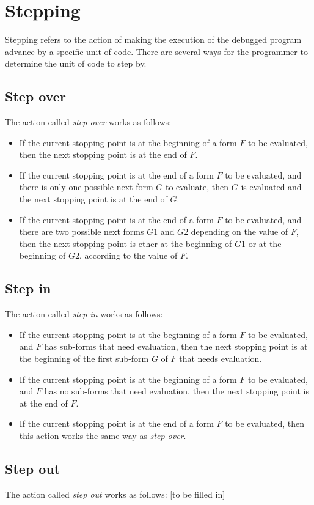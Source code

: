 \chapter{Stepping}

Stepping refers to the action of making the execution of the debugged
program advance by a specific unit of code.  There are several ways
for the programmer to determine the unit of code to step by.

\section{Step over}

The action called \emph{step over} works as follows:

\begin{itemize}
\item If the current stopping point is at the beginning of a form $F$
  to be evaluated, then the next stopping point is at the end of $F$.
\item If the current stopping point is at the end of a form $F$ to be
  evaluated, and there is only one possible next form $G$ to evaluate,
  then $G$ is evaluated and the next stopping point is at
  the end of $G$.
\item If the current stopping point is at the end of a form $F$ to be
  evaluated, and there are two possible next forms $G1$ and $G2$
  depending on the value of $F$, then the next stopping point is ether
  at the beginning of $G1$ or at the beginning of $G2$, according to
  the value of $F$.
\end{itemize}

\section{Step in}

The action called \emph{step in} works as follows:

\begin{itemize}
\item If the current stopping point is at the beginning of a form $F$
  to be evaluated, and $F$ has sub-forms that need evaluation, then
  the next stopping point is at the beginning of the first sub-form
  $G$ of $F$ that needs evaluation.
\item If the current stopping point is at the beginning of a form $F$
  to be evaluated, and $F$ has no sub-forms that need evaluation, then
  the next stopping point is at the end of $F$.
\item If the current stopping point is at the end of a form $F$ to be
  evaluated, then this action works the same way as \emph{step over}.
\end{itemize}

\section{Step out}

The action called \emph{step out} works as follows:
[to be filled in]

